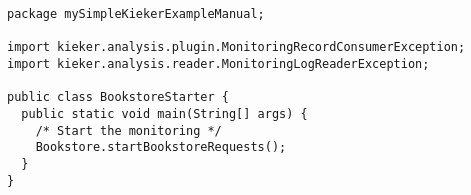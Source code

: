 \begin{lstlisting}[caption=BookstoreStarter.java] 
package mySimpleKiekerExampleManual;

import kieker.analysis.plugin.MonitoringRecordConsumerException; 
import kieker.analysis.reader.MonitoringLogReaderException;

public class BookstoreStarter { 
  public static void main(String[] args) { 
	/* Start the monitoring */ 
	Bookstore.startBookstoreRequests(); 
  }
} 
\end{lstlisting}